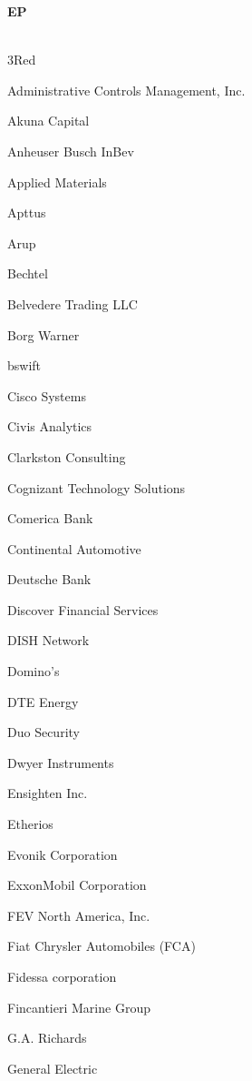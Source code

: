 \documentclass[twoside]{article}
\begin{document}
\begin{center}
\begin{multicols}{5}
\begin{FlushLeft}
        \end{FlushLeft}
        \vspace{1em}
        {\fontsize{14}{16}\selectfont \bf EP}\\
        \vspace{-1em}
        ~\hrulefill~
        \vspace{-.9em}
        \begin{FlushLeft}
        \begin{compactitem}
        \item 3Red
\item Administrative Controls Management, Inc.
\item Akuna Capital
\item Anheuser Busch InBev
\item Applied Materials
\item Apttus
\item Arup
\item Bechtel
\item Belvedere Trading LLC
\item Borg Warner
\item bswift
\item Cisco Systems
\item Civis Analytics
\item Clarkston Consulting
\item Cognizant Technology Solutions
\item Comerica Bank
\item Continental Automotive
\item Deutsche Bank
\item Discover Financial Services
\item DISH Network
\item Domino's
\item DTE Energy
\item Duo Security
\item Dwyer Instruments
\item Ensighten Inc.
\item Etherios
\item Evonik Corporation
\item ExxonMobil Corporation
\item FEV North America, Inc.
\item Fiat Chrysler Automobiles (FCA)
\item Fidessa corporation
\item Fincantieri Marine Group
\item G.A. Richards
\item General Electric

\end{compactitem}
\end{FlushLeft}
\end{multicols}
\end{center}
\end{document}
